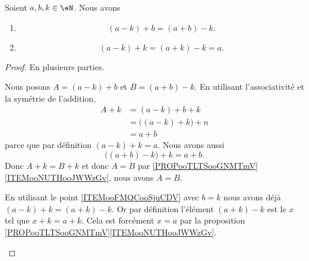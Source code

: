 \begin{proposition}	\label{PROPooAKLVooBkRIAT}
	Soient \( a,b,k\in \eN\). Nous avons
	\begin{enumerate}
		\item			\label{ITEMooFMQCooSjuCDV}
		      \begin{equation}
			      (a-k)+b=(a+b)-k.
		      \end{equation}
		\item		\label{ITEMooKHLDooEEXjmF}
		      \begin{equation}
			      (a-k)+k=(a+k)-k=a.
		      \end{equation}
	\end{enumerate}
\end{proposition}

\begin{proof}
	En plusieurs parties.
	\begin{subproof}

		Nous posons \( A=(a-k)+b\) et \( B=(a+b)-k\). En utilisant l'associativité et la symétrie de l'addition,
		\begin{subequations}
			\begin{align}
				A+k & =(a-k)+b+k             \\
				    & =\big( (a-k)+k \big)+n \\
				    & =a+b
			\end{align}
		\end{subequations}
		parce que par définition \( (a-k)+k=a\). Nous avons aussi
		\begin{equation}
			\big( (a+b)-k \big)+k=a+b.
		\end{equation}
		Donc \( A+k=B+k\) et donc \( A=B\) par \ref{PROPooTLTSooGNMTmV}\ref{ITEMooNUTHooJWWzGv}, nous avons \( A=B\).

		En utilisant le point \ref{ITEMooFMQCooSjuCDV} avec \( b=k\) nous avons déjà \( (a-k)+k=(a+k)-k \). Or par définition l'élément \( (a+k)-k\) est le \( x\) tel que \( x+k=a+k\). Cela est forcément \( x=a\) par la proposition \ref{PROPooTLTSooGNMTmV}\ref{ITEMooNUTHooJWWzGv}.
	\end{subproof}
\end{proof}

